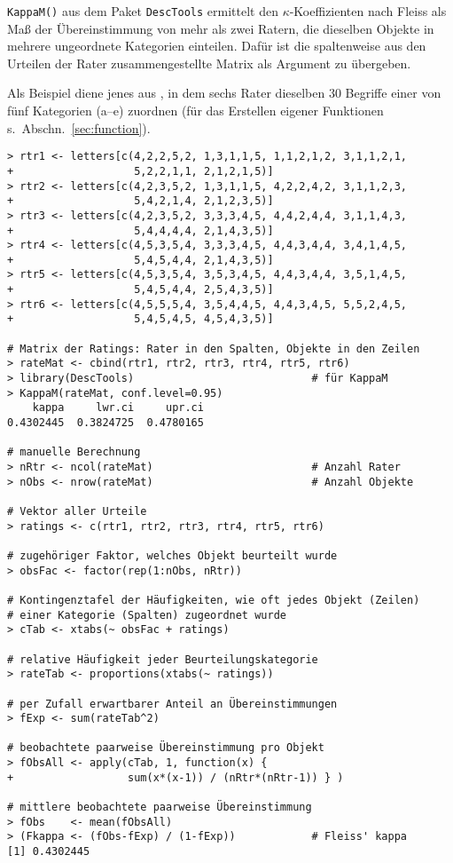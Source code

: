 \lstinline!KappaM()! aus dem Paket \lstinline!DescTools! ermittelt den $\kappa$-Koeffizienten nach Fleiss als Maß der Übereinstimmung von mehr als zwei Ratern, die dieselben Objekte in mehrere ungeordnete Kategorien einteilen. Dafür ist die spaltenweise aus den Urteilen der Rater zusammengestellte Matrix als Argument zu übergeben.

Als Beispiel diene jenes aus , in dem sechs Rater dieselben $30$ Begriffe einer von fünf Kategorien (a--e) zuordnen (für das Erstellen eigener Funktionen s.\ Abschn.\ \ref{sec:function}).
\begin{lstlisting}
> rtr1 <- letters[c(4,2,2,5,2, 1,3,1,1,5, 1,1,2,1,2, 3,1,1,2,1,
+                   5,2,2,1,1, 2,1,2,1,5)]
> rtr2 <- letters[c(4,2,3,5,2, 1,3,1,1,5, 4,2,2,4,2, 3,1,1,2,3,
+                   5,4,2,1,4, 2,1,2,3,5)]
> rtr3 <- letters[c(4,2,3,5,2, 3,3,3,4,5, 4,4,2,4,4, 3,1,1,4,3,
+                   5,4,4,4,4, 2,1,4,3,5)]
> rtr4 <- letters[c(4,5,3,5,4, 3,3,3,4,5, 4,4,3,4,4, 3,4,1,4,5,
+                   5,4,5,4,4, 2,1,4,3,5)]
> rtr5 <- letters[c(4,5,3,5,4, 3,5,3,4,5, 4,4,3,4,4, 3,5,1,4,5,
+                   5,4,5,4,4, 2,5,4,3,5)]
> rtr6 <- letters[c(4,5,5,5,4, 3,5,4,4,5, 4,4,3,4,5, 5,5,2,4,5,
+                   5,4,5,4,5, 4,5,4,3,5)]

# Matrix der Ratings: Rater in den Spalten, Objekte in den Zeilen
> rateMat <- cbind(rtr1, rtr2, rtr3, rtr4, rtr5, rtr6)
> library(DescTools)                            # für KappaM
> KappaM(rateMat, conf.level=0.95)
    kappa     lwr.ci     upr.ci
0.4302445  0.3824725  0.4780165

# manuelle Berechnung
> nRtr <- ncol(rateMat)                         # Anzahl Rater
> nObs <- nrow(rateMat)                         # Anzahl Objekte

# Vektor aller Urteile
> ratings <- c(rtr1, rtr2, rtr3, rtr4, rtr5, rtr6)

# zugehöriger Faktor, welches Objekt beurteilt wurde
> obsFac <- factor(rep(1:nObs, nRtr))

# Kontingenztafel der Häufigkeiten, wie oft jedes Objekt (Zeilen)
# einer Kategorie (Spalten) zugeordnet wurde
> cTab <- xtabs(~ obsFac + ratings)

# relative Häufigkeit jeder Beurteilungskategorie
> rateTab <- proportions(xtabs(~ ratings))

# per Zufall erwartbarer Anteil an Übereinstimmungen
> fExp <- sum(rateTab^2)

# beobachtete paarweise Übereinstimmung pro Objekt
> fObsAll <- apply(cTab, 1, function(x) {
+                  sum(x*(x-1)) / (nRtr*(nRtr-1)) } )

# mittlere beobachtete paarweise Übereinstimmung
> fObs    <- mean(fObsAll)
> (Fkappa <- (fObs-fExp) / (1-fExp))            # Fleiss' kappa
[1] 0.4302445
\end{lstlisting}

